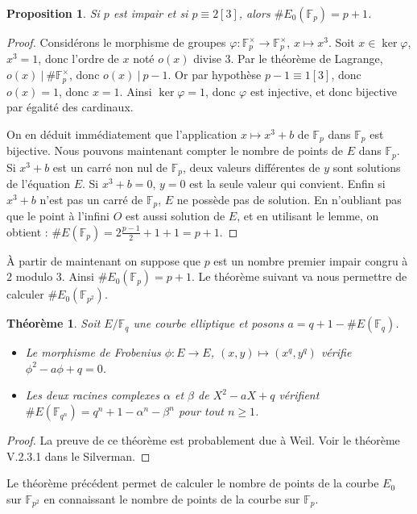 \documentclass{article}
\newtheorem{thm}{Théorème}
\newtheorem{prop}{Proposition}
\newcommand{\Fp}{\mathbb{F}_{p}}
\newcommand{\Fq}{\mathbb{F}_{p^2}}
\newcommand{\F}{\mathbb{F}}
\begin{document}
\begin{prop}
  Si $p$ est impair et si $p \equiv 2 [3]$, alors $\#E_0(\Fp) = p+1$.
\end{prop}

\begin{proof}
  Considérons le morphisme de groupes $\varphi \colon \Fp^\times \to \Fp^\times$, $x \mapsto x^3$. 
  Soit $x\in \ker \varphi$, $x^3 = 1$, donc l'ordre de $x$ noté $o(x)$ divise $3$. 
  Par le théorème de Lagrange, $o(x)\ |\ \#\Fp^\times$, donc $o(x)\ |\ p-1$. 
  Or par hypothèse $p-1\equiv 1[3]$, donc $o(x) = 1$, donc $x = 1$.
  Ainsi $\ker \varphi = {1}$, donc $\varphi$ est injective, et donc bijective par égalité des cardinaux.

  On en déduit immédiatement que l'application $x \mapsto x^3 + b$ de $\Fp$ dans $\Fp$ est bijective.
  Nous pouvons maintenant compter le nombre de points de $E$ dans $\Fp$. 
  Si $x^3 + b$ est un carré non nul de $\Fp$, deux valeurs différentes de $y$ sont solutions de l'équation $E$. 
  Si $x^3 + b = 0$, $y = 0$ est la seule valeur qui convient.
  Enfin si $x^3 + b$ n'est pas un carré de $\Fp$, $E$ ne possède pas de solution.
  En n'oubliant pas que le point à l'infini $O$ est aussi solution de $E$, et en utilisant le lemme, on obtient : $\#E(\Fp) = 2\frac{p-1}{2} + 1 + 1 = p+1$.
\end{proof}

À partir de maintenant on suppose que $p$ est un nombre premier impair congru à $2$ modulo $3$. 
Ainsi $\#E_0(\Fp) = p+1$. 
Le théorème suivant va nous permettre de calculer $\#E_0(\F_{p^2})$. 

\begin{thm}
  Soit $E/\F_q$ une courbe elliptique et posons $a = q + 1 - \#E(\F_q)$.
  \begin{itemize}
    \item Le morphisme de Frobenius $\phi \colon E \to E$, $(x, y) \mapsto (x^q, y^q)$ vérifie $\phi^2 - a\phi + q = 0$.
    \item Les deux racines complexes $\alpha$ et $\beta$ de $X^2 - aX + q$ vérifient $\#E(\F_{q^n}) = q^n + 1 - \alpha^n - \beta^n$ pour tout $n\ge1$. 
  \end{itemize}
\end{thm}

\begin{proof}
  La preuve de ce théorème est probablement due à Weil. Voir le théorème V.2.3.1 dans le Silverman.
\end{proof}

Le théorème précédent permet de calculer le nombre de points de la courbe $E_0$ sur $\Fq$ en connaissant le nombre de points de la courbe sur $\Fp$.
\end{document}
